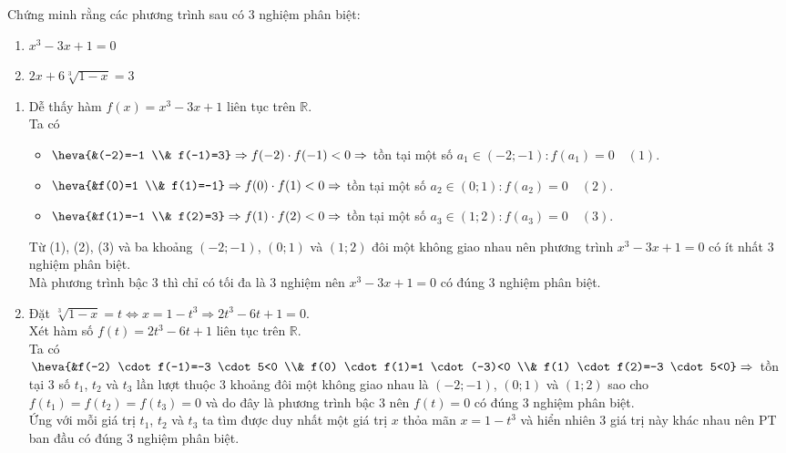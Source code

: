 \begin{bt}%
	Chứng minh rằng các phương trình sau có $3$ nghiệm phân biệt:
	\begin{enumerate}
		\item $x^3-3 x+1=0$
		\item $2 x+6 \sqrt[3]{1-x}=3$
	\end{enumerate}
	\loigiai
	{\begin{enumerate}
			\item Dễ thấy hàm $f(x)=x^3-3 x+1$ liên tục trên $\mathbb{R}$.\\
			Ta có
			\begin{itemize}
				\item  $\heva{&(-2)=-1 \\& f(-1)=3} \Rightarrow f(-2) \cdot f(-1)<0\\ \Rightarrow$ tồn tại một số $a_1 \in(-2 ;-1): f(a_1)=0\quad(1)$.
				\item $\heva{&f(0)=1 \\& f(1)=-1} \Rightarrow f(0) \cdot f(1)<0 \Rightarrow$ tồn tại một số $a_2 \in(0 ; 1): f\left(a_2\right)=0\quad(2)$.
				\item $\heva{&f(1)=-1 \\& f(2)=3} \Rightarrow f(1) \cdot f(2)<0 \Rightarrow$ tồn tại một số $a_3 \in(1 ; 2): f\left(a_3\right)=0\quad(3)$.
			\end{itemize}
			Từ (1), (2), (3) và ba khoảng $(-2 ;-1)$, $(0 ; 1)$ và $(1 ; 2)$ đôi một không giao nhau nên phương trình $x^3-3 x+1=0$ có ít nhất $3$ nghiệm phân biệt.\\
			Mà phương trình bậc $3$ thì chỉ có tối đa là $3$ nghiệm nên $x^3-3 x+1=0$ có đúng $3$ nghiệm phân biệt.
			\item  Đặt $\sqrt[3]{1-x}=t \Leftrightarrow x=1-t^3 \Rightarrow 2 t^3-6 t+1=0$.\\
			Xét hàm số $f(t)=2 t^3-6 t+1$ liên tục trên $\mathbb{R}$.\\
			Ta có $\heva{&f(-2) \cdot f(-1)=-3 \cdot 5<0 \\& f(0) \cdot f(1)=1 \cdot(-3)<0 \\& f(1) \cdot f(2)=-3 \cdot 5<0} \Rightarrow$ tồn tại $3$ số $t_1$, $t_2$ và $t_3$ lần lượt thuộc $3$ khoảng đôi một không giao nhau là $(-2 ;-1)$, $(0 ; 1)$ và $(1 ; 2)$ sao cho $f\left(t_1\right)=f\left(t_2\right)=f\left(t_3\right)=0$ và do đây là phương trình bậc $3$ nên $f(t)=0$ có đúng $3$ nghiệm phân biệt.\\
			Ứng với mỗi giá trị $t_1$, $t_2$ và $t_3$ ta tìm được duy nhất một giá trị $x$ thỏa mãn $x=1-t^3$ và hiển nhiên $3$ giá trị này khác nhau nên PT ban đầu có đúng $3$ nghiệm phân biệt.	
		\end{enumerate}
	}
\end{bt}

